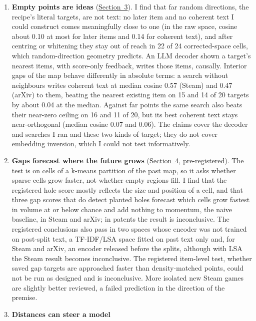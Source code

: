 \documentclass[
  10pt,
]{article}
\providecommand{\tightlist}{%
  \setlength{\itemsep}{0pt}\setlength{\parskip}{0pt}}
\begin{document}
\begin{enumerate}
\def\labelenumi{\arabic{enumi}.}
\tightlist
\item
  \textbf{Empty points are ideas}
  (\hyperref[sec:3]{Section~3}). I find
  that far random directions, the
  recipe's literal targets, are not
  text: no later item and no coherent
  text I could construct comes
  meaningfully close to one (in the raw
  space, cosine about 0.10 at most for
  later items and 0.14 for coherent
  text), and after centring or whitening
  they stay out of reach in 22 of 24
  corrected-space cells, which
  random-direction geometry predicts. An
  LLM decoder shown a target's nearest
  items, with score-only feedback,
  writes those items, causally. Interior
  gaps of the map behave differently in
  absolute terms: a search without
  neighbours writes coherent text at
  median cosine 0.57 (Steam) and 0.47
  (arXiv) to them, beating the nearest
  existing item on 15 and 14 of 20
  targets by about 0.04 at the median.
  Against far points the same search
  also beats their near-zero ceiling on
  16 and 11 of 20, but its best coherent
  text stays near-orthogonal (median
  cosine 0.07 and 0.06). The claims
  cover the decoder and searches I ran
  and these two kinds of target; they do
  not cover embedding inversion, which I
  could not test informatively.
\item
  \textbf{Gaps forecast where the future
  grows} (\hyperref[sec:4]{Section~4},
  pre-registered). The test is on cells
  of a k-means partition of the past
  map, so it asks whether sparse cells
  grow faster, not whether empty regions
  fill. I find that the registered hole
  score mostly reflects the size and
  position of a cell, and that three gap
  scores that do detect planted holes
  forecast which cells grow fastest in
  volume at or below chance and add
  nothing to momentum, the naive
  baseline, in Steam and arXiv; in
  patents the result is inconclusive.
  The registered conclusions also pass
  in two spaces whose encoder was not
  trained on post-split text, a
  TF-IDF/LSA space fitted on past text
  only and, for Steam and arXiv, an
  encoder released before the splits,
  although with LSA the Steam result
  becomes inconclusive. The registered
  item-level test, whether saved gap
  targets are approached faster than
  density-matched points, could not be
  run as designed and is inconclusive.
  More isolated new Steam games are
  slightly better reviewed, a failed
  prediction in the direction of the
  premise.
\item
  \textbf{Distances can steer a model
}
\end{enumerate}
\end{document}
